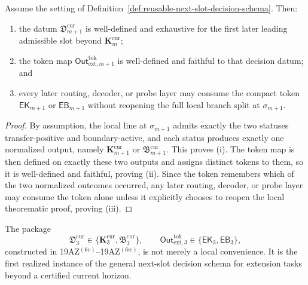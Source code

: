 \begin{proposition}
\label{prop:any-normalized-first-slot-extension-stage-collapses-to-one-finite-decision-datum-and-one-faithful-token}
Assume the setting of Definition~\ref{def:reusable-next-slot-decision-schema}. Then:
\begin{enumerate}[label=(\roman*)]
  \item the datum $\mathfrak D_{m+1}^{\mathrm{cur}}$ is well-defined and exhaustive for the first later leading admissible slot beyond $\mathbf K_m^{\mathrm{cur}}$;
  \item the token map $\mathsf{Out}^{\mathrm{tok}}_{\mathrm{ext},m+1}$ is well-defined and faithful to that decision datum; and
  \item every later routing, decoder, or probe layer may consume the compact token $\mathsf{EK}_{m+1}$ or $\mathsf{EB}_{m+1}$ without reopening the full local branch split at $\sigma_{m+1}$.
\end{enumerate}
\end{proposition}

\begin{proof}
By assumption, the local line at $\sigma_{m+1}$ admits exactly the two statuses transfer-positive and boundary-active, and each status produces exactly one normalized output, namely $\mathbf K_{m+1}^{\mathrm{cur}}$ or $\mathfrak B_{m+1}^{\mathrm{cur}}$. This proves (i). The token map is then defined on exactly these two outputs and assigns distinct tokens to them, so it is well-defined and faithful, proving (ii). Since the token remembers which of the two normalized outcomes occurred, any later routing, decoder, or probe layer may consume the token alone unless it explicitly chooses to reopen the local theorematic proof, proving (iii).
\end{proof}

\begin{corollary}
\label{cor:sigma3-decision-package-is-the-first-realized-instance-of-reusable-extension-schema}
The package
\[
  \mathfrak D_3^{\mathrm{cur}}
  \in
  \{\mathbf K_3^{\mathrm{cur}},\mathfrak B_3^{\mathrm{cur}}\},
  \qquad
  \mathsf{Out}^{\mathrm{tok}}_{\mathrm{ext},3}
  \in
  \{\mathsf{EK}_3,\mathsf{EB}_3\},
\]
constructed in 19AZ$^{(6v)}$--19AZ$^{(6w)}$, is not merely a local convenience. It is the first realized instance of the general next-slot decision schema for extension tasks beyond a certified current horizon.
\end{corollary}

